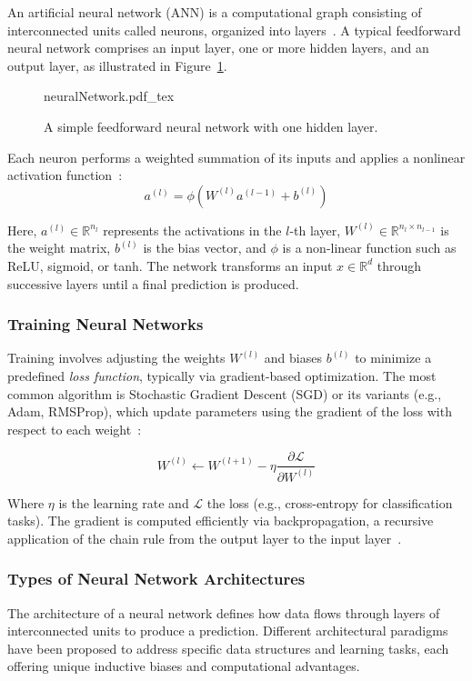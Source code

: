 An artificial neural network (ANN) is a computational graph consisting of interconnected units called neurons, organized into layers~\cite{lecun2015deep}. A typical feedforward neural network comprises an input layer, one or more hidden layers, and an output layer, as illustrated in Figure~\ref{fig:NN}.
\begin{figure}[h!]
	\centering
        \def\svgwidth{330pt}
 	{neuralNetwork.pdf_tex} 	  	 	
	\caption[A simple feedforward neural network with one hidden layer]{A simple feedforward neural network with one hidden layer.}
	\label{fig:NN}
\end{figure}
Each neuron performs a weighted summation of its inputs and applies a nonlinear activation function~\cite{goodfellow2016deep}:
\begin{equation}
a^{(l)} = \phi \left(W^{(l)} a^{(l-1)} + b^{(l)} \right)
\end{equation}

Here, $a^{(l)} \in \mathbb{R}^{n_l}$ represents the activations in the $l$-th layer, $W^{(l)} \in \mathbb{R}^{n_l \times n_{l-1}}$ is the weight matrix, $b^{(l)}$ is the bias vector, and $\phi$ is a non-linear function such as ReLU, sigmoid, or tanh. The network transforms an input $x \in \mathbb{R}^d$ through successive layers until a final prediction is produced.

\subsubsection{Training Neural Networks}
Training involves adjusting the weights $W^{(l)}$ and biases $b^{(l)}$ to minimize a predefined \textit{loss function}, typically via gradient-based optimization. The most common algorithm is Stochastic Gradient Descent (SGD) or its variants (e.g., Adam, RMSProp), which update parameters using the gradient of the loss with respect to each weight~\cite{bottou2012stochastic}:

\begin{equation}
W^{(l)} \leftarrow W^{(l+1)} - \eta \frac{\partial \mathcal{L}}{\partial W^{(l)}}
\end{equation}

Where $\eta$ is the learning rate and $\mathcal{L}$ the loss (e.g., cross-entropy for classification tasks). The gradient is computed efficiently via backpropagation, a recursive application of the chain rule from the output layer to the input layer~\cite{rumelhart1986learning}.

\subsubsection{Types of Neural Network Architectures}
The architecture of a neural network defines how data flows through layers of interconnected units to produce a prediction. Different architectural paradigms have been proposed to address specific data structures and learning tasks, each offering unique inductive biases and computational advantages.

